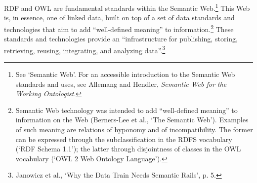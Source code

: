 RDF and OWL are fundamental standards within the Semantic Web.\footnote{See `Semantic Web'. For an accessible introduction to the Semantic Web standards and uses, see Allemang and Hendler, \textit{Semantic Web for the Working Ontologist}.} %
This Web is, in essence, one of linked data, built on top of a set of data standards and technologies that aim to add ``well-defined meaning'' to information.\footnote{Semantic Web technology was intended to add ``well-defined meaning'' to information on the Web (Berners-Lee et al., `The Semantic Web'). Examples of such meaning are relations of hyponomy and of incompatibility. The former can be expressed through the subclassification in the RDFS vocabulary (`RDF Schema 1.1'); the latter through disjointness of classes in the OWL vocabulary (`OWL 2 Web Ontology Language').} These standards and technologies provide an ``infrastructure for publishing, storing, retrieving, reusing, integrating, and analyzing data''.\footnote{Janowicz et al., `Why the Data Train Needs Semantic Rails', p. 5.} %
\begin{comment}
The Semantic Web standards have strong ties with linguistics (semantics in particular),\footnote{Semantic Web technology was intended to add ``well-defined meaning'' to information on the Web (Berners-Lee et al., `The Semantic Web'). Examples of such meaning are relations of hyponomy and of incompatibility. The former can be expressed through the subclassification in the RDFS vocabulary (`RDF Schema 1.1'); the latter through disjointness of classes in the OWL vocabulary (`OWL 2 Web Ontology Language').} internet technology (sharing and referring via internet protocols such as HTTP),\footnote{See `RDF 1.1 Concepts and Abstract Syntax';
and Berners-Lee, `Linked Data: Design Issues'.%
} mathematics (using set theory to classify),\footnote{See the section Classes in `RDF Schema 1.1'; and the specifications for classes and restrictions in `OWL 2 Web Ontology Language'.} and formal logic (inferring new information from existing statements).\footnote{See specifications for entailments in `RDF 1.1 Semantics'. A more accessible introduction is provided in chapter 6, `RDF and inferencing', in Allemang and Hendler, \textit{Semantic Web for the Working Ontologist}.} These influences have resulted in a data form that:
\end{comment}
